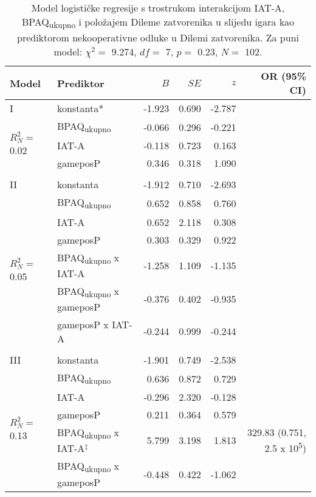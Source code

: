 \documentclass[a4paper, 12pt]{report}
\begin{document}
\begin{table}
    \begin{center}
        \caption{\label{glmtotposP} Model logističke regresije s trostrukom interakcijom IAT-A,
            BPAQ\textsubscript{ukupno} i položajem Dileme zatvorenika u slijedu
            igara kao prediktorom
            nekooperativne odluke u Dilemi zatvorenika. 
            Za puni model: $\chi^2 =$ 9.274, $df =$ 7, $p =$ 0.23, $N
            =$ 102.}
        \hspace*{-0.7cm}\begin{tabular}{llrrrr}
        \toprule
        Model & Prediktor & $B$ & $SE$ & $z$ & OR (95\% CI)\\
        \midrule
        I & konstanta* & -1.923 & 0.690 & -2.787 &\\
        \multirow{3}{*}{$R^2_N =$ 0.02}
        &BPAQ\textsubscript{ukupno} & -0.066 & 0.296 & -0.221 &\\
        &IAT-A & -0.118 & 0.723 & 0.163 &\\
        &gameposP & 0.346 & 0.318 & 1.090  &\\
        &&&&&\\ 
        II & konstanta & -1.912 & 0.710 & -2.693 &\\
        \multirow{6}{*}{$R^2_N =$ 0.05}
        &BPAQ\textsubscript{ukupno} & 0.652 & 0.858 & 0.760 &\\
        &IAT-A & 0.652 & 2.118 & 0.308 &\\
        &gameposP & 0.303 & 0.329 & 0.922 &\\
        &BPAQ\textsubscript{ukupno} x IAT-A & -1.258 & 1.109 & -1.135 &\\
        &BPAQ\textsubscript{ukupno} x gameposP & -0.376 & 0.402 & -0.935 &\\
        &gameposP x IAT-A & -0.244 & 0.999 & -0.244 &\\
        &&&&&\\ 
        III & konstanta & -1.901 & 0.749 & -2.538 &\\
        \multirow{7}{*}{$R^2_N =$ 0.13}
        &BPAQ\textsubscript{ukupno} & 0.636 & 0.872 & 0.729 & \\
        &IAT-A & -0.296 & 2.320 & -0.128 &\\
        &gameposP & 0.211 & 0.364 & 0.579  &\\
        &BPAQ\textsubscript{ukupno} x IAT-A$^\ddagger$ & 5.799 & 3.198 & 1.813 &
        329.83 (0.751, 2.5 x 10\textsuperscript{5})\\
        &BPAQ\textsubscript{ukupno} x gameposP & -0.448 & 0.422 & -1.062 &\\

\end{tabular}
\end{center}
\end{table}
\end{document}
